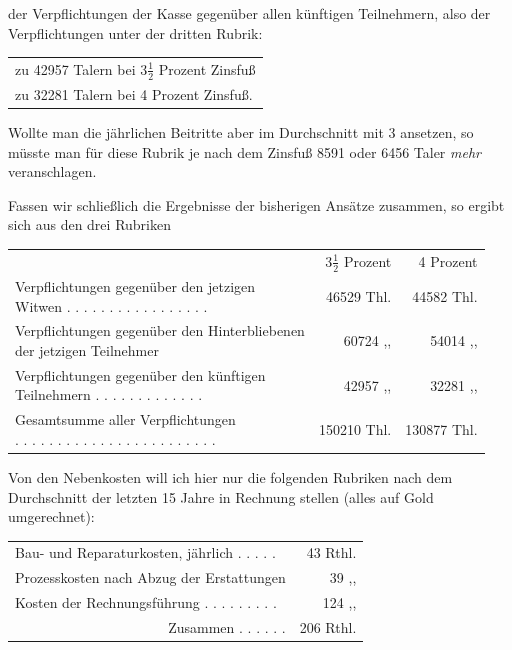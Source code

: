 der Verpflichtungen der Kasse gegenüber allen künftigen Teilnehmern, also der Verpflichtungen unter der dritten Rubrik:
\begin{center}
\begin{tabular}{l}
zu 42957 Talern bei \(3\tfrac{1}{2}\) Prozent Zinsfuß\\
zu 32281 Talern bei 4 Prozent Zinsfuß.
\end{tabular}
\end{center}
\noindent\hspace*{\parindent}Wollte man die jährlichen Beitritte aber im Durchschnitt mit 3 ansetzen, so müsste man für diese Rubrik je nach dem Zinsfuß 8591 oder 6456 Taler \textit{mehr} veranschlagen.

Fassen wir schließlich die Ergebnisse der bisherigen Ansätze zusammen, so ergibt sich aus den drei Rubriken
\begin{center}
\footnotesize\setlength{\tabcolsep}{3pt}
\begin{tabular}{l r|r}
&\(3\tfrac{1}{2}\) Prozent&4 Prozent\\
\shortstack[l]{Verpflichtungen gegenüber den jetzigen\\Witwen . . . . . . . . . . . . . . . . .}&46529 Thl.&44582 Thl.\\
\shortstack[l]{Verpflichtungen gegenüber den Hinterbliebenen\\der jetzigen Teilnehmer}&60724 ,, &54014 ,, \\
\shortstack[l]{Verpflichtungen gegenüber den künftigen\\Teilnehmern . . . . . . . . . . . . .}&42957 ,, &32281 ,, \\\cline{2-3}
\shortstack[l]{Gesamtsumme aller Verpflichtungen\\ . . . . . . . . . . . . . . . . . . . . . . . .}&150210 Thl.&130877 Thl.
\end{tabular}
\end{center}
\noindent\hspace*{\parindent}Von den Nebenkosten will ich hier nur die folgenden Rubriken nach dem Durchschnitt der letzten 15 Jahre in Rechnung stellen (alles auf Gold umgerechnet):
\begin{center}
\small\setlength{\tabcolsep}{3pt}
\begin{tabular}{l r}
Bau- und Reparaturkosten, jährlich . . . . .&43 Rthl.\\
Prozesskosten nach Abzug der Erstattungen&39 ,, \\
Kosten der Rechnungsführung . . . . . . . . .&124 ,, \\\cline{2-2}
\multicolumn{1}{r}{Zusammen . . . . . .}&206 Rthl.
\end{tabular}
\end{center}
